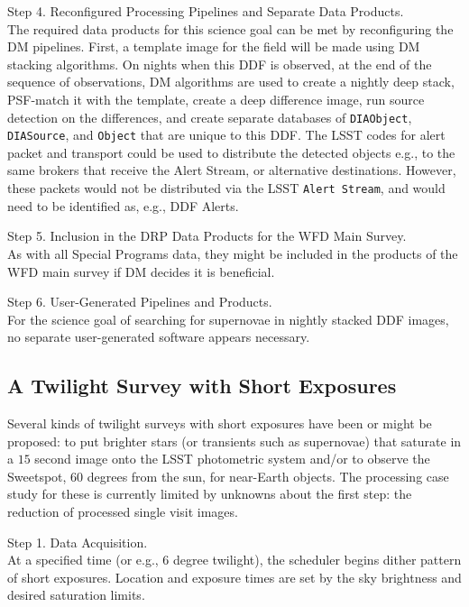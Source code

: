 \documentclass[DM,lsstdoc,toc]{lsstdoc}
\begin{document}
Step 4. Reconfigured Processing Pipelines and Separate Data Products. \\
The required data products for this science goal can be met by reconfiguring the DM pipelines. First, a template image for the field will be made using DM stacking algorithms. On nights when this DDF is observed, at the end of the sequence of observations, DM algorithms are used to create a nightly deep stack, PSF-match it with the template, create a deep difference image, run source detection on the differences, and create separate databases of \texttt{DIAObject}, \texttt{DIASource}, and \texttt{Object} that are unique to this DDF. The LSST codes for alert packet and transport could be used to distribute the detected objects e.g., to the same brokers that receive the Alert Stream, or alternative destinations. However, these packets would not be distributed via the LSST {\tt Alert Stream}, and would need to be identified as, e.g., DDF Alerts.

Step 5. Inclusion in the DRP Data Products for the WFD Main Survey. \\
As with all Special Programs data, they might be included in the products of the WFD main survey if DM decides it is beneficial.

Step 6. User-Generated Pipelines and Products. \\
For the science goal of searching for supernovae in nightly stacked DDF images, no separate user-generated software appears necessary.


\subsection{A Twilight Survey with Short Exposures}\label{ssec:SPCS_Twilight}

Several kinds of twilight surveys with short exposures have been or might be proposed: to put brighter stars (or transients such as supernovae) that saturate in a $15$ second image onto the LSST photometric system and/or to observe the Sweetspot, 60 degrees from the sun, for near-Earth objects. The processing case study for these is currently limited by unknowns about the first step: the reduction of processed single visit images.

Step 1. Data Acquisition. \\
At a specified time (or e.g., 6 degree twilight), the scheduler begins dither pattern of short exposures. Location and exposure times are set by the sky brightness and desired saturation limits.
\end{document}
